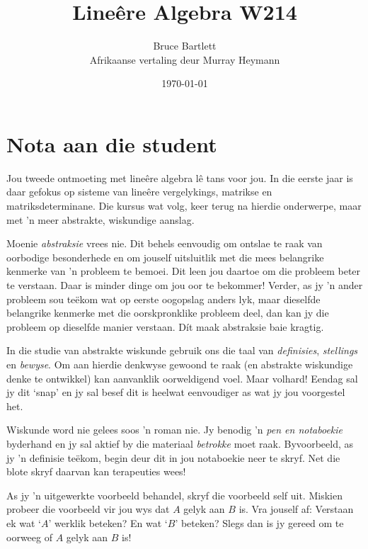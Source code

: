 \documentclass[a4paper,11pt]{book}
\theoremstyle{definition}
\begin{document}
\frontmatter

\author{{\Large Bruce Bartlett}  \\ {\large Afrikaanse vertaling deur
Murray Heymann}}
\title{Line{\^e}re Algebra W214}
\date{\today}



\maketitle
\tableofcontents


\chapter{Nota aan die student}

Jou tweede ontmoeting met line{\^e}re algebra l{\^e} tans voor jou. In die
eerste jaar is daar gefokus op sisteme van line{\^e}re vergelykings,
matrikse en matriksdeterminane. Die kursus wat volg, keer terug na hierdie
onderwerpe, maar met 'n meer abstrakte, wiskundige aanslag.

Moenie \emph{abstraksie} vrees nie. Dit behels eenvoudig om ontslae te raak
van oorbodige besonderhede en om jouself uitsluitlik met die mees
belangrike kenmerke van 'n probleem te bemoei. Dit leen jou daartoe om
die probleem beter te verstaan. Daar is minder dinge om jou oor te
bekommer! Verder, as jy 'n ander probleem sou te{\"e}kom wat op eerste
oogopslag anders lyk, maar dieselfde belangrike kenmerke met die
oorskpronklike probleem deel, dan kan jy die probleem op dieselfde manier
verstaan. Dít maak abstraksie baie kragtig.

In die studie van abstrakte wiskunde gebruik ons die taal van
\emph{definisies}, \emph{stellings} en \emph{bewyse}. Om aan hierdie
denkwyse gewoond te raak (en abstrakte wiskundige denke te ontwikkel) kan
aanvanklik oorweldigend voel. Maar volhard!  Eendag sal jy dit `snap' en jy
sal besef dit is heelwat eenvoudiger as wat jy jou voorgestel het.

Wiskunde word nie gelees soos 'n roman nie. Jy benodig 'n \emph{pen en
notaboekie} byderhand en jy sal aktief by die materiaal \emph{betrokke}
moet raak. Byvoorbeeld, as jy 'n definisie te{\"e}kom, begin deur dit in
jou notaboekie neer te skryf.  Net die blote skryf daarvan kan terapeuties
wees!

As jy 'n uitgewerkte voorbeeld behandel, skryf die voorbeeld self uit.
Miskien probeer die voorbeeld vir jou wys dat $A$ gelyk aan $B$ is. Vra
jouself af:  Verstaan ek wat `$A$' werklik beteken?  En wat `$B$' beteken?
Slegs dan is jy gereed om te oorweeg of $A$ gelyk aan $B$ is!
\end{document}
